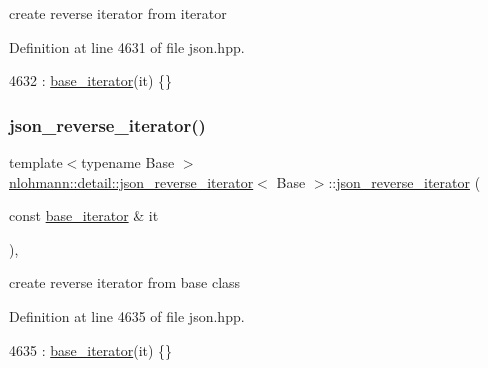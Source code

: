 create reverse iterator from iterator 



Definition at line 4631 of file json.\+hpp.


\begin{DoxyCode}
4632         : \hyperlink{classnlohmann_1_1detail_1_1json__reverse__iterator_a6b2ef1d632fe49bfcc22fbd1abd62395}{base\_iterator}(it) \{\}
\end{DoxyCode}
\mbox{\label{classnlohmann_1_1detail_1_1json__reverse__iterator_a6c2d025530114ed989188e8adfc8467e}} 
\subsubsection{\texorpdfstring{json\+\_\+reverse\+\_\+iterator()}{json\_reverse\_iterator()}\hspace{0.1cm}{\footnotesize\ttfamily [2/2]}}
{\footnotesize\ttfamily template$<$typename Base $>$ \\
\hyperlink{classnlohmann_1_1detail_1_1json__reverse__iterator}{nlohmann\+::detail\+::json\+\_\+reverse\+\_\+iterator}$<$ Base $>$\+::\hyperlink{classnlohmann_1_1detail_1_1json__reverse__iterator}{json\+\_\+reverse\+\_\+iterator} (\begin{DoxyParamCaption}\item[{const \hyperlink{classnlohmann_1_1detail_1_1json__reverse__iterator_a6b2ef1d632fe49bfcc22fbd1abd62395}{base\+\_\+iterator} \&}]{it }\end{DoxyParamCaption})\hspace{0.3cm}{\ttfamily [inline]}, {\ttfamily [noexcept]}}



create reverse iterator from base class 



Definition at line 4635 of file json.\+hpp.


\begin{DoxyCode}
4635 : \hyperlink{classnlohmann_1_1detail_1_1json__reverse__iterator_a6b2ef1d632fe49bfcc22fbd1abd62395}{base\_iterator}(it) \{\}
\end{DoxyCode}


